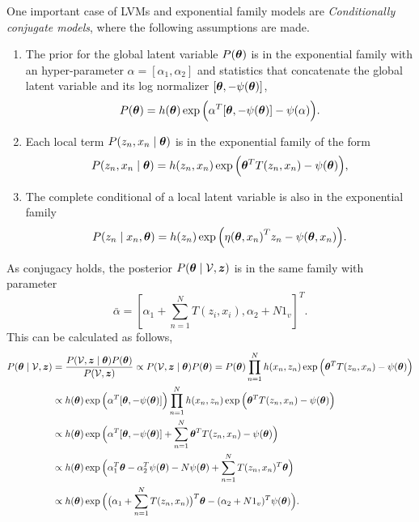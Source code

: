 One important case of LVMs and exponential family models are \emph{Conditionally conjugate models}, where the following assumptions are made.
\begin{enumerate}
  \item The prior for the global latent variable \(P(\bm{\theta})\) is in the exponential family with an hyper-parameter \(\alpha = [\alpha_{1}, \alpha_{2}]\) and statistics that concatenate the global latent variable and its log normalizer \([\bm{\theta}, -\psi(\bm{\theta})]\),
    \[
    P(\bm{\theta}) = h(\bm{\theta}) \exp \Big( \alpha^{T}[\bm{\theta}, -\psi(\bm{\theta})] - \psi(\alpha)\Big).
    \]
  \item Each local term \(P(z_{n},x_{n} \mid \bm{\theta})\) is in the exponential family of the form
    \[
    P(z_{n},x_{n} \mid \bm{\theta}) = h(z_{n}, x_{n}) \exp \Big( \bm{\theta}^{T} T(z_{n}, x_{n}) - \psi(\bm{\theta}) \Big),
    \]

  \item The complete conditional of a local latent variable is also in the exponential family
    \[
    P(z_{n}\mid x_{n} , \bm{\theta}) =  h(z_{n})\exp \Big( {\eta(\bm{\theta}, x_{n})}^{T}z_{n} - \psi(\bm{\theta}, x_{n}) \Big).
    \]


\end{enumerate}



As conjugacy holds, the posterior \(P(\bm{\theta} \mid \mathcal{V}, \bm{z})\) is in the same family with parameter
\[
  \bar{\alpha} = [\alpha_{1} + \sum_{n=1}^{N} T(z_{i}, x_{i}), \alpha_{2}+ N1_{v}]^{T}.
\]
This can be calculated as follows,
\[
  \begin{aligned}
    P(\bm{\theta} \mid \mathcal{V}, \bm{z}) &= \frac{P(\mathcal{V}, \bm{z} \mid \bm{\theta}) P(\bm{\theta})}{P(\mathcal{V}, \bm{z})} \propto  P(\mathcal{V}, \bm{z} \mid \bm{\theta}) P(\bm{\theta}) = P(\bm{\theta}) \prod_{n=1}^{N}h(x_{n}, z_{n})\exp \Big( \bm{\theta}^{T}T(z_{n}, x_{n})  - \psi(\bm{\theta}) \Big)\\
    &\propto  h(\bm{\theta}) \exp \Big( \alpha^{T}[\bm{\theta}, -\psi(\bm{\theta})]\Big)  \prod_{n=1}^{N}h(x_{n}, z_{n})\exp \Big( \bm{\theta}^{T}T(z_{n}, x_{n})  - \psi(\bm{\theta}) \Big)\\
    &\propto h(\bm{\theta}) \exp \Big(   \alpha^{T}[\bm{\theta}, -\psi(\bm{\theta})] + \sum_{n=1}^{N}  \bm{\theta}^{T}T(z_{n}, x_{n})  - \psi(\bm{\theta})  \Big)\\
    &\propto h(\bm{\theta}) \exp \Big(   \alpha_{1}^{T}\bm{\theta}  - \alpha_{2}^{T}\psi(\bm{\theta}) - N\psi(\bm{\theta}) + \sum_{n=1}^{N}  T(z_{n}, x_{n})^{T}\bm{\theta}  \Big)\\
    &\propto h(\bm{\theta}) \exp \Big(   \big(\alpha_{1} + \sum_{n=1}^{N}  T(z_{n}, x_{n})\big)^{T} \bm{\theta}  - (\alpha_{2} + N1_{v})^{T}\psi(\bm{\theta}) \Big).
  \end{aligned}
\]

